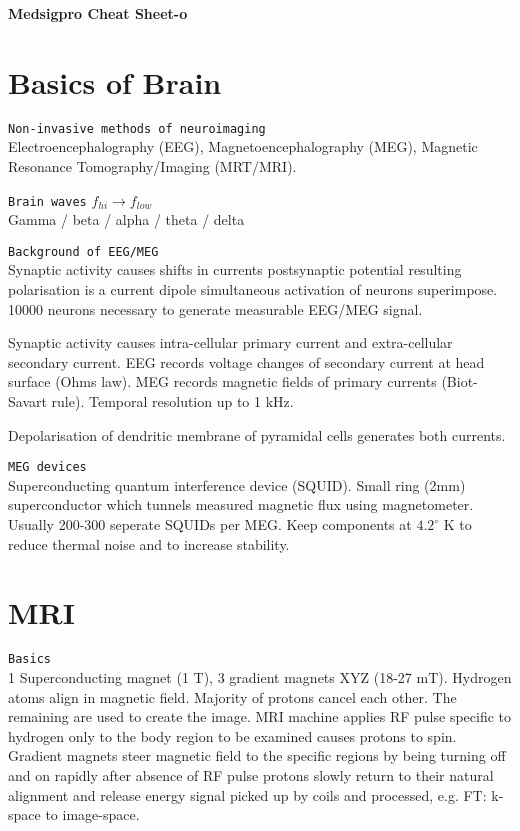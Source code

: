 

\begin{center}
     \Large{\textbf{Medsigpro Cheat Sheet-o}} \\
\end{center}

\section{Basics of Brain}
\verb!Non-invasive methods of neuroimaging!\\
Electroencephalography (EEG), Magnetoencephalography (MEG), Magnetic Resonance Tomography/Imaging (MRT/MRI).\vs

\verb!Brain waves! $f_{hi} \rightarrow f_{low}$\\
Gamma / beta / alpha / theta / delta \vs

\verb!Background of EEG/MEG!\\
Synaptic activity causes shifts in currents \arr postsynaptic potential \arr resulting polarisation is a current dipole \arr simultaneous activation of neurons superimpose. 10000 neurons necessary to generate measurable EEG/MEG signal. \vs

Synaptic activity causes intra-cellular primary current and extra-cellular secondary current. EEG records voltage changes of secondary current at head surface (Ohms law). MEG records magnetic fields of primary currents (Biot-Savart rule). Temporal resolution up to 1 kHz.\vs

Depolarisation of dendritic membrane of pyramidal cells generates both currents.\vs\vs

\verb!MEG devices!\\
Superconducting quantum interference device (SQUID). Small ring (2mm) superconductor which tunnels measured magnetic flux using magnetometer. Usually 200-300 seperate SQUIDs per MEG. Keep components at $4.2 ^\circ$ K to reduce thermal noise and to increase stability.

\section{MRI}
\verb!Basics!\\
1 Superconducting magnet (1 T), 3 gradient magnets XYZ (18-27 mT). Hydrogen atoms align in magnetic field. Majority of protons cancel each other. The remaining are used to create the image. MRI machine applies RF pulse specific to hydrogen only to the body region to be examined \arr causes protons to spin. Gradient magnets steer magnetic field to the specific regions by being turning off and on rapidly \arr after absence of RF pulse protons slowly return to their natural alignment and release energy \arr signal picked up by coils and processed, e.g. FT: k-space to image-space. \vs

